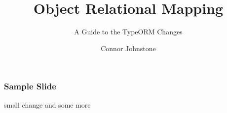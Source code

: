 \documentclass{beamer}
\title[]{Object Relational Mapping}
\subtitle[]{A Guide to the TypeORM Changes}
\author[]{Connor Johnstone}
\institute[]{Palski and Associates}
\date{}
\begin{document}
  \begin{frame}
  \titlepage
  \end{frame}

  \begin{frame}[fragile]
  \frametitle{Sample Slide}
  small change
  and some more
  \end{frame}
\end{document}
